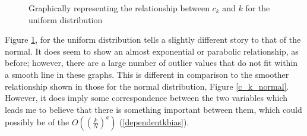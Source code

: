\documentclass[12pt]{report}
\begin{document}
\begin{figure}
\caption{Graphically representing the relationship between $c_{k}$ and $k$ for the uniform distribution} \label{c_k_uniform}
\end{figure}

Figure \ref{c_k_uniform}, for the uniform distribution tells a slightly different story to that of the normal. It does seem to show an almost exponential or parabolic relationship, as before; however, there are a large number of outlier values that do not fit within a smooth line in these graphs. This is different in comparison to the smoother relationship shown in those for the normal distribution, Figure \ref{c_k_normal}. However, it does imply some correspondence between the two variables which leads me to believe that there is something important between them, which could possibly be of the $O\left( \left( \frac{k}{N} \right)^{a} \right)$ (\ref{dependentkbias}).
\end{document}
